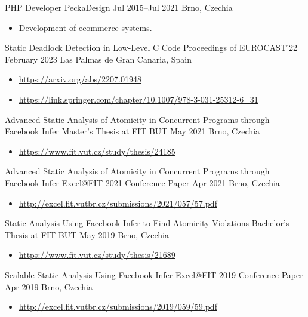 \documentclass[10pt, a4paper, academicons]{altacv}
\newcommand{\hrefd}[1]{\href{#1}{#1}}
\begin{document}
\cvevent
{PHP Developer}
{PeckaDesign}
{Jul 2015--Jul 2021}
{Brno, Czechia}
\begin{itemize}\setlength{\itemindent}{0.5em}\small
    \item[--] Development of ecommerce systems.
\end{itemize}



\cvevent
{Static Deadlock Detection in Low-Level C Code}
{Proceedings of EUROCAST'22}
{February 2023}
{Las Palmas de Gran Canaria, Spain}
\begin{itemize}\setlength{\itemindent}{.5em}\small
    \item[--] \hrefd{https://arxiv.org/abs/2207.01948}
    \item[--]
        \hrefd{https://link.springer.com/chapter/10.1007/978-3-031-25312-6\_31}
\end{itemize}
\medskip

\cvevent
{Advanced Static Analysis of Atomicity in Concurrent Programs through Facebook Infer}
{Master's Thesis at FIT BUT}
{May 2021}
{Brno, Czechia}
\begin{itemize}\setlength{\itemindent}{.5em}\small
    \item[--] \hrefd{https://www.fit.vut.cz/study/thesis/24185}
\end{itemize}
\medskip

\cvevent
{Advanced Static Analysis of Atomicity in Concurrent Programs through Facebook Infer}
{Excel@FIT 2021 Conference Paper}
{Apr 2021}
{Brno, Czechia}
\begin{itemize}\setlength{\itemindent}{.5em}\small
    \item[--] \hrefd{http://excel.fit.vutbr.cz/submissions/2021/057/57.pdf}
\end{itemize}
\medskip

\cvevent
{Static Analysis Using Facebook Infer to Find Atomicity Violations}
{Bachelor's Thesis at FIT BUT}
{May 2019}
{Brno, Czechia}
\begin{itemize}\setlength{\itemindent}{.5em}\small
    \item[--] \hrefd{https://www.fit.vut.cz/study/thesis/21689}
\end{itemize}
\medskip

\cvevent
{Scalable Static Analysis Using Facebook Infer}
{Excel@FIT 2019 Conference Paper}
{Apr 2019}
{Brno, Czechia}
\begin{itemize}\setlength{\itemindent}{.5em}\small
    \item[--] \hrefd{http://excel.fit.vutbr.cz/submissions/2019/059/59.pdf}
\end{itemize}
\end{document}
